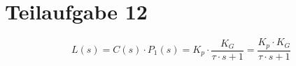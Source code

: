 \section{Teilaufgabe 12}
\[ L(s) = C(s) \cdot P_1(s) = K_p \cdot \frac{K_G}{\tau \cdot s + 1} 
    = \frac{K_p \cdot K_G}{\tau \cdot s + 1} \]

